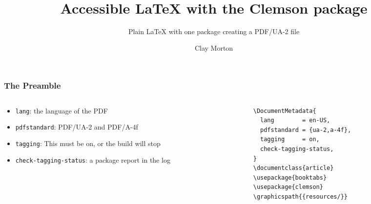 \documentclass{ltx-talk}
\title{Accessible LaTeX with the Clemson package}
\subtitle{Plain LaTeX with one package creating a PDF/UA-2 file}
\author{Clay Morton}
\institute{Clemson University}
\date{}
\begin{document}
\begin{frame}
  \maketitle
\end{frame}

\begin{frame*}
  \frametitle{The Preamble}
  \begin{columns}
    \begin{column}{.34\textwidth}
      \begin{itemize}
        \item \texttt{lang}: the language of the PDF
        \item \texttt{pdfstandard}: PDF/UA-2 and PDF/A-4f
        \item \texttt{tagging}: This must be on, or the build will stop
        \item \texttt{check-tagging-status}: a package report in the log
      \end{itemize}
    \end{column}
    \begin{column}{.44\textwidth}
\small
\begin{verbatim}
\DocumentMetadata{
  lang        = en-US,
  pdfstandard = {ua-2,a-4f},
  tagging     = on,
  check-tagging-status,
}
\documentclass{article}
\usepackage{booktabs}
\usepackage{clemson}
\graphicspath{{resources/}}
\end{verbatim}
    \end{column}
  \end{columns}
\end{frame*}
\end{document}
